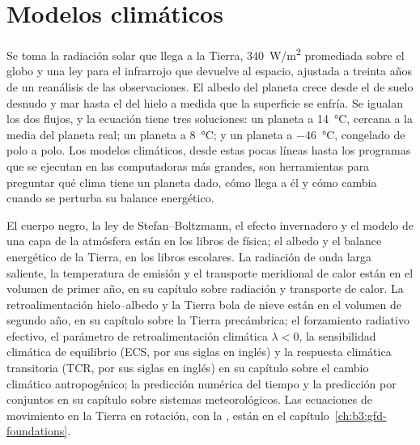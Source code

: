 \chapter{Modelos climáticos}\label{ch:b3:climate-models}

Se toma la radiación solar que llega a la Tierra, \qty{340}{W/m^2} promediada sobre
el globo y una ley para el infrarrojo que devuelve al espacio, ajustada a
treinta años de un reanálisis de las observaciones. El albedo del planeta crece desde el de
suelo desnudo y mar hasta el del hielo a medida que la superficie se enfría. Se igualan los dos
flujos, y la ecuación tiene tres soluciones: un planeta a
\qty{14}{\celsius}, cercana a la media del planeta real; un planeta a
\qty{8}{\celsius}; y un planeta a \qty{-46}{\celsius}, congelado de polo a
polo. Los modelos climáticos, desde estas pocas líneas hasta los programas que se ejecutan en las
computadoras más grandes, son herramientas para preguntar qué clima tiene un planeta dado, cómo
llega a él y cómo cambia cuando se perturba su balance energético.

\begin{recall}
El cuerpo negro, la ley de Stefan--Boltzmann, el efecto invernadero y el
modelo de una capa de la atmósfera están en los libros de física; el albedo y el
balance energético de la Tierra, en los libros escolares. La radiación de onda larga
saliente, la temperatura de emisión y el transporte meridional de calor están en el
volumen de primer año, en su capítulo sobre radiación y transporte de calor.
La retroalimentación hielo--albedo y la Tierra bola de nieve están en el volumen de segundo año, en
su capítulo sobre la Tierra precámbrica; el forzamiento radiativo efectivo, el
parámetro de retroalimentación climática $\lambda < 0$, la sensibilidad climática de
equilibrio (ECS, por sus siglas en inglés) y la respuesta climática transitoria (TCR, por sus siglas en inglés) en su capítulo
sobre el cambio climático antropogénico; la predicción numérica del tiempo y la
predicción por conjuntos en su capítulo sobre sistemas meteorológicos. Las ecuaciones de
movimiento en la Tierra en rotación, con la , están en
el capítulo~\ref{ch:b3:gfd-foundations}.
\end{recall}

